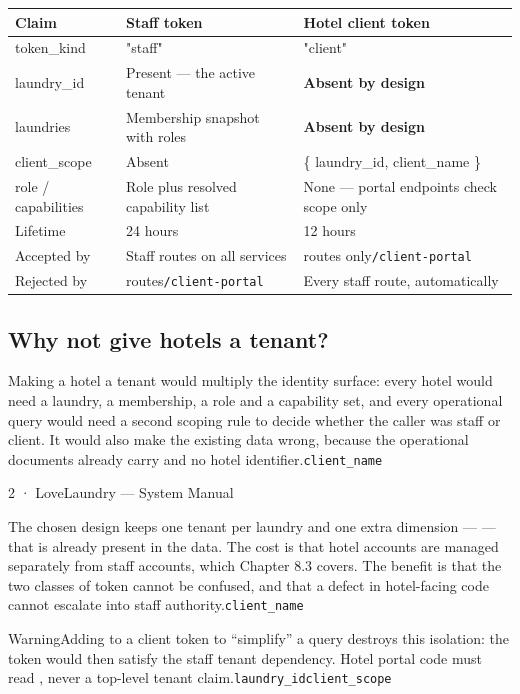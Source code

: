 \documentclass[11pt,a4paper,oneside]{book}
\begin{document}
\begin{center}\small
\begin{tabularx}{\linewidth}{|X|X|X|}
\hline
\rowcolor{lightgrey}
\textbf{Claim} & \textbf{Staff token} & \textbf{Hotel client token} \\ \hline
token\_kind & "staff" & "client" \\ \hline
laundry\_id & Present — the active tenant & \textbf{Absent by design} \\ \hline
laundries & Membership snapshot with roles & \textbf{Absent by design} \\ \hline
client\_scope & Absent & \{ laundry\_id, client\_name \} \\ \hline
role / capabilities & Role plus resolved capability list & None — portal endpoints check scope only \\ \hline
Lifetime & 24 hours & 12 hours \\ \hline
Accepted by & Staff routes on all services & routes only\texttt{/client-portal} \\ \hline
Rejected by & routes\texttt{/client-portal} & Every staff route, automatically \\ \hline
\end{tabularx}
\end{center}
\subsection*{Why not give hotels a tenant?}
Making a hotel a tenant would multiply the identity surface: every hotel would need a laundry, a membership, a role and a capability set, and every operational query would need a second scoping rule to decide whether the caller was staff or client. It would also make the existing data wrong, because the operational documents already carry  and no hotel identifier.\texttt{client\_name}

2 · LoveLaundry — System Manual

The chosen design keeps one tenant per laundry and one extra dimension —  — that is already present in the data. The cost is that hotel accounts are managed separately from staff accounts, which Chapter 8.3 covers. The benefit is that the two classes of token cannot be confused, and that a defect in hotel-facing code cannot escalate into staff authority.\texttt{client\_name}

\begin{notebox}WarningAdding  to a client token to “simplify” a query destroys this isolation: the token would then satisfy the staff tenant dependency. Hotel portal code must read , never a top-level tenant claim.\texttt{laundry\_id}\texttt{client\_scope}\end{notebox}
\end{document}
